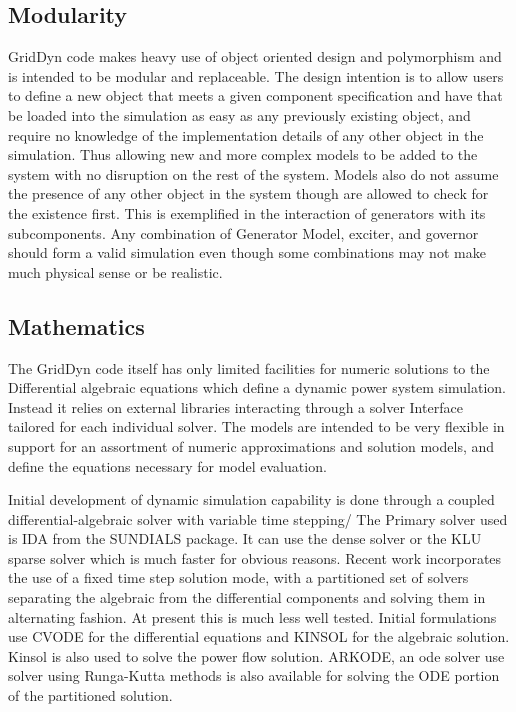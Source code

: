 \documentclass[12pt]{article} %
\begin{document}
\subsection{Modularity}
GridDyn code makes heavy use of object oriented design and polymorphism and is intended to be modular and replaceable.  The design intention is to allow users to define a new object that meets a given component specification and have that be loaded into the simulation as easy as any previously existing object, and require no knowledge of the implementation details of any other object in the simulation.  Thus allowing new and more complex models to be added to the system with no disruption on the rest of the system.  Models also do not assume the presence of any other object in the system though are allowed to check for the existence first.  This is exemplified in the interaction of generators with its subcomponents.  Any combination of Generator Model, exciter, and governor should form a valid simulation even though some combinations may not make much physical sense or be realistic.

\subsection{Mathematics}
The GridDyn code itself has only limited facilities for numeric solutions to the Differential algebraic equations which define a dynamic power system simulation.  Instead it relies on external libraries interacting through a solver Interface tailored for each individual solver.  The models are intended to be very flexible in support for an assortment of numeric approximations and solution models, and define the equations necessary for model evaluation.

Initial development of dynamic simulation capability is done through a coupled differential-algebraic solver with variable time stepping/  The Primary solver used is IDA from the SUNDIALS package\cite{sundials}.  It can use the dense solver or the KLU sparse solver which is much faster for obvious reasons.  Recent work incorporates the use of a fixed time step solution mode, with a partitioned set of solvers separating the algebraic from the differential components and solving them in alternating fashion.  At present this is much less well tested.  Initial formulations use CVODE for the differential equations and KINSOL for the algebraic solution.  Kinsol is also used to solve the power flow solution.  ARKODE, an ode solver use solver using Runga-Kutta methods is also available for solving the ODE portion of the partitioned solution.
\end{document}

